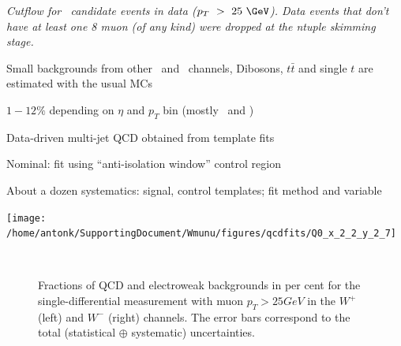 {
\begin{table}
\footnotesize
\begin{center}

\caption{\it Cutflow for \Wmn\ candidate events in data ($p_T~>~25~\GeV$). Data events that don't have at least one 8 \GeV muon (of any kind) were dropped at the ntuple skimming stage.}
\end{center}
\end{table}
}

{
\iteb
\item Small backgrounds from other \Zll\ and \Wln\ channels, Dibosons,
  $t\bar{t}$ and single $t$ are estimated with the usual MCs
\iteb
  \item $1-12\%$ depending on $\eta$ and $p_T$ bin (mostly \Wtau\ and \Zll)
\itee
\item Data-driven multi-jet QCD obtained from template fits
\iteb
\item Nominal: \MET fit using ``anti-isolation window'' control region
\item About a dozen systematics: signal, control templates; fit method and variable
\itee
\itee

\centering
\texttt{[image: /home/antonk/SupportingDocument/Wmunu/figures/qcdfits/Q0\_x\_2\_2\_y\_2\_7]}

}

{
\begin{figure}[phtb]
  \begin{center}
        \\
    \caption{Fractions of QCD and electroweak backgrounds in per cent for the single-differential measurement with muon $p_{T} > 25 GeV$
      in the $W^+$ (left) and $W^-$ (right) channels. The error bars correspond to the total  (statistical  $\oplus$ systematic) uncertainties.}
 \end{center}
\end{figure}
}

